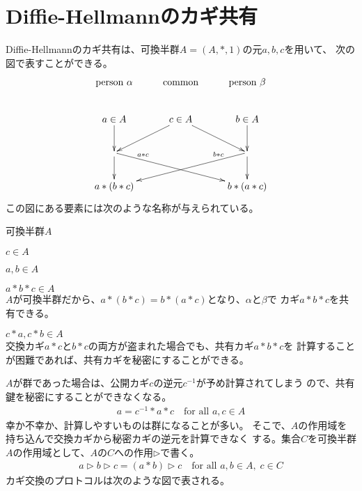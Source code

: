{\section{Diffie-Hellmannのカギ共有}\label{s1:Diffie-Hellmannのカギ共有} %
	Diffie-Hellmannのカギ共有は、可換半群$A=(A,*,1)$の元$a,b,c$を用いて、
	次の図で表すことができる。
	\begin{equation*}\xymatrix{
		\text{person }\alpha & \text{common} & \text{person }\beta \\
		a\in A \ar[d] & c\in A \ar[ld] \ar[rd] & b\in A \ar[d] \\
		\ar[d] \ar[rrd]^(0.2){a*c} & & \ar[d] \ar[lld]_(0.2){b*c} \\
		a*(b*c) & & b*(a*c) \\
	}\end{equation*}
	この図にある要素には次のような名称が与えられている。
	\begin{description}\setlength{\itemsep}{-1mm} %
		\item[公開アルゴリズム] 可換半群$A$
		\item[公開カギ] $c\in A$
		\item[秘密カギ] $a,b\in A$
		\item[共有カギ] $a*b*c\in A$ \\
		$A$が可換半群だから、$a*(b*c)=b*(a*c)$となり、$\alpha$と$\beta$で
		カギ$a*b*c$を共有できる。
		\item[交換カギ] $c*a,c*b\in A$ \\
		交換カギ$a*c$と$b*c$の両方が盗まれた場合でも、共有カギ$a*b*c$を
		計算することが困難であれば、共有カギを秘密にすることができる。
	\end{description} %
	$A$が群であった場合は、公開カギ$c$の逆元$c^{-1}$が予め計算されてしまう
	ので、共有鍵を秘密にすることができなくなる。
	\begin{equation*}\begin{split}
		a = c^{-1}*a*c \quad\text{for all }a,c\in A
	\end{split}\end{equation*}
	幸か不幸か、計算しやすいものは群になることが多い。
	そこで、$A$の作用域を持ち込んで交換カギから秘密カギの逆元を計算できなく
	する。集合$C$を可換半群$A$の作用域として、$A$の$C$への作用$\rhd$で書く。
	\begin{equation*}\begin{split}
		a\rhd b\rhd c = (a*b)\rhd c \quad\text{for all } a,b\in A,\; c\in C
	\end{split}\end{equation*}
	カギ交換のプロトコルは次のような図で表される。
}
